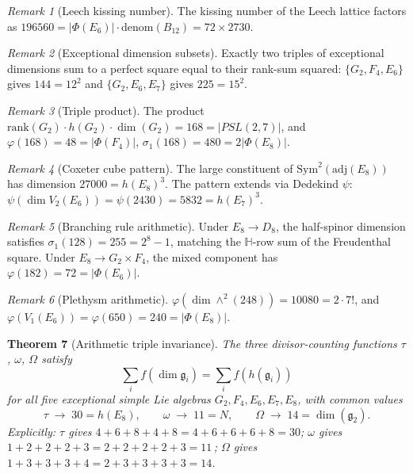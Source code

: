 \documentclass[11pt]{amsart}
\theoremstyle{plain}
\newtheorem{theorem}{Theorem}[section]
\theoremstyle{definition}
\theoremstyle{remark}
\newtheorem{remark}[theorem]{Remark}
\renewcommand{\Phi}{\varPhi}
\begin{document}
\begin{remark}[Leech kissing number]\label{rem:leech}
The kissing number of the Leech lattice factors as
$196560 = |\Phi(E_6)| \cdot \mathrm{denom}(B_{12}) = 72 \times 2730$.
\end{remark}

\begin{remark}[Exceptional dimension subsets]\label{rem:subset-squares}
Exactly two triples of exceptional dimensions sum to a perfect square
equal to their rank-sum squared: $\{G_2, F_4, E_6\}$ gives $144 = 12^2$
and $\{G_2, E_6, E_7\}$ gives $225 = 15^2$.
\end{remark}

\begin{remark}[Triple product]\label{rem:triple-product}
The product $\mathrm{rank}(G_2) \cdot h(G_2) \cdot \dim(G_2) = 168 = |PSL(2,7)|$,
and $\varphi(168) = 48 = |\Phi(F_4)|$, $\sigma_1(168) = 480 = 2|\Phi(E_8)|$.
\end{remark}

\begin{remark}[Coxeter cube pattern]\label{rem:coxeter-cube}
The large constituent of $\mathrm{Sym}^2(\mathrm{adj}(E_8))$ has dimension
$27000 = h(E_8)^3$. The pattern extends via Dedekind $\psi$:
$\psi(\dim V_2(E_6)) = \psi(2430) = 5832 = h(E_7)^3$.
\end{remark}

\begin{remark}[Branching rule arithmetic]\label{rem:branching}
Under $E_8 \to D_8$, the half-spinor dimension satisfies $\sigma_1(128) = 255 = 2^8 - 1$,
matching the $\mathbb{H}$-row sum of the Freudenthal square.  Under $E_8 \to G_2 \times F_4$,
the mixed component has $\varphi(182) = 72 = |\Phi(E_6)|$.
\end{remark}

\begin{remark}[Plethysm arithmetic]\label{rem:plethysm}
$\varphi(\dim\wedge^2(248)) = 10080 = 2 \cdot 7!$, and
$\varphi(V_1(E_6)) = \varphi(650) = 240 = |\Phi(E_8)|$.
\end{remark}

\begin{theorem}[Arithmetic triple invariance]\label{thm:triple-invariance}
The three divisor-counting functions $\tau$, $\omega$, $\Omega$ satisfy
\[
  \sum_{i} f(\dim \mathfrak{g}_i) = \sum_{i} f(h(\mathfrak{g}_i))
\]
for all five exceptional simple Lie algebras $G_2, F_4, E_6, E_7, E_8$, with
common values
\[
  \tau \;\to\; 30 = h(E_8), \qquad
  \omega \;\to\; 11 = N, \qquad
  \Omega \;\to\; 14 = \dim(\mathfrak{g}_2).
\]
Explicitly: $\tau$ gives $4+6+8+4+8 = 4+6+6+6+8 = 30$; $\omega$ gives
$1+2+2+2+3 = 2+2+2+2+3 = 11$\,\textup{;} $\Omega$ gives $1+3+3+3+4 =
2+3+3+3+3 = 14$.
\end{theorem}
\end{document}
